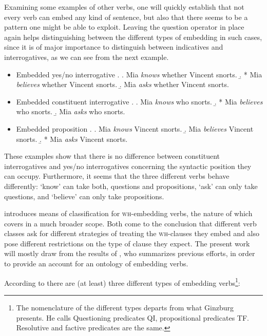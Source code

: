 \documentclass[notitlepage,twoside,a4paper]{scrreprt}
\newcommand{\wh}{\textsc{wh}}
\theoremstyle{remark}
\theoremstyle{remark}
\theoremstyle{definition}
\theoremstyle{definition}
\begin{document}
Examining some examples of other verbs, one will quickly establish that not
every verb can embed any kind of sentence, but also that there seems to be  a
pattern one might be able to exploit. Leaving the question operator in place
again helps distinguishing between the different types of embedding in such
cases, since it is of major importance to distinguish between indicatives and
interrogatives, as we can see from the next example.

\begin{itemize}
  \item Embedded yes/no interrogative
  \ex. \a. Mia \emph{knows} whether Vincent snorts.
  \b. * Mia \emph{believes} whether Vincent snorts.
  \b. Mia \emph{asks} whether Vincent snorts.

  \item Embedded constituent interrogative
  \ex. \a.  Mia \emph{knows} who snorts.
  \b. * Mia \emph{believes} who snorts.
  \b. Mia \emph{asks} who snorts.

  \item Embedded proposition
  \ex. \a. Mia \emph{knows} Vincent snorts.
  \b. Mia \emph{believes} Vincent snorts.
  \b. * Mia \emph{asks} Vincent snorts.

\end{itemize}

These examples show that there is no difference between
constituent interrogatives and yes/no interrogatives concerning the syntactic
position they can occupy. Furthermore, it seems that the three different verbs
behave differently: `know' can take both, questions and propositions, `ask' can
only take questions, and `believe' can only take propositions.

\cite{karttunen:1977} introduces means of classification for \wh-embedding
verbs, the nature of which \cite{lahiri:diss} covers in a much broader scope.
Both come to the conclusion that different verb classes ask for different
strategies of treating the \wh-clauses they embed and also pose different
restrictions on the type of clause they expect. The present work will mostly
draw from the results of \cite{ginzburg}, who summarizes previous efforts,
in order to provide an account for an ontology of embedding verbs.

According to \cite{ginzburg} there are (at least) three different types of
embedding verbs\footnote{The nomenclature of the different types departs from
what Ginzburg presents. He calls Questioning predicates QI, propositional
predicates TF. Resolutive and factive predicates are the same.}:
\end{document}

